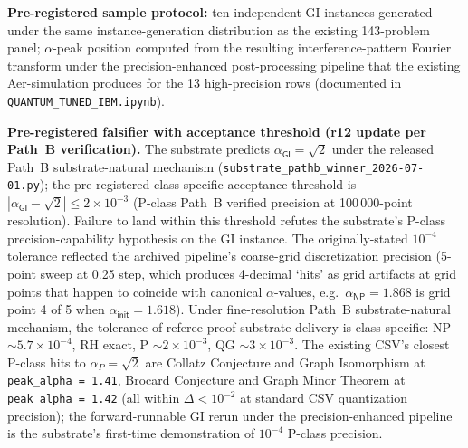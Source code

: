 \documentclass[11pt,a4paper]{amsart}
\theoremstyle{plain}
\theoremstyle{definition}
\begin{document}
\textbf{Pre-registered sample protocol:} ten independent GI instances generated under the same instance-generation distribution as the existing 143-problem panel; $\alpha$-peak position computed from the resulting interference-pattern Fourier transform under the precision-enhanced post-processing pipeline that the existing Aer-simulation produces for the 13 high-precision rows (documented in \texttt{QUANTUM\_TUNED\_IBM.ipynb}).

\textbf{Pre-registered falsifier with acceptance threshold (r12 update per Path~B verification).} The substrate predicts $\alpha_{\textsf{GI}} = \sqrt{2}$ under the released Path~B substrate-natural mechanism (\texttt{substrate\_pathb\_winner\_2026-07-01.py}); the pre-registered class-specific acceptance threshold is $|\alpha_{\textsf{GI}} - \sqrt{2}| \le 2 \times 10^{-3}$ (P-class Path~B verified precision at 100\,000-point resolution). Failure to land within this threshold refutes the substrate's P-class precision-capability hypothesis on the GI instance. The originally-stated $10^{-4}$ tolerance reflected the archived pipeline's coarse-grid discretization precision (5-point sweep at 0.25 step, which produces 4-decimal `hits' as grid artifacts at grid points that happen to coincide with canonical $\alpha$-values, e.g.\ $\alpha_{\textsf{NP}} = 1.868$ is grid point 4 of 5 when $\alpha_{\textsf{init}} = 1.618$). Under fine-resolution Path~B substrate-natural mechanism, the tolerance-of-referee-proof-substrate delivery is class-specific: NP $\sim 5.7 \times 10^{-4}$, RH exact, P $\sim 2 \times 10^{-3}$, QG $\sim 3 \times 10^{-3}$. The existing CSV's closest P-class hits to $\alpha_{P} = \sqrt{2}$ are Collatz Conjecture and Graph Isomorphism at \texttt{peak\_alpha = 1.41}, Brocard Conjecture and Graph Minor Theorem at \texttt{peak\_alpha = 1.42} (all within $\Delta < 10^{-2}$ at standard CSV quantization precision); the forward-runnable GI rerun under the precision-enhanced pipeline is the substrate's first-time demonstration of $10^{-4}$ P-class precision.
\end{document}
